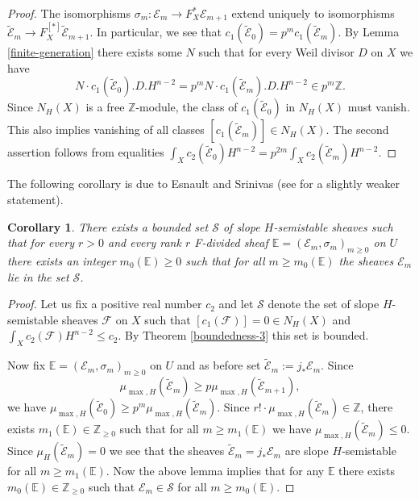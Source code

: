 \documentclass[twoside, 11pt]{article}
\theoremstyle{plain}
\newtheorem{Corollary}[Thm]{\sc Corollary}
\theoremstyle{definition}
\theoremstyle{remark}
\newcommand{\EE}{{\mathbb E}}
\newcommand{\ZZ}{{\mathbb Z}}
\newcommand{\cS}{{\mathcal S}}
\newcommand{\cE}{{\mathcal E}}
\newcommand{\cF}{{\mathcal F}}
\begin{document}
\begin{proof}
The isomorphisms $\sigma _m: \cE _m\to F_X^{*}\cE _{m+1}$ extend uniquely to
 isomorphisms $\tilde \cE _m\to F_X^{[*]}\tilde \cE _{m+1}$.
In particular, we see that $c_1 (\tilde \cE _{0})= p^{m}  c_1(\tilde \cE _{m})$. By Lemma \ref{finite-generation}
there exists some $N$ such that for every Weil divisor $D$ on $X$ we have
 $$N\cdot c_1 (\tilde \cE _{0}).D.H^{n-2}= p^{m}  N \cdot c_1(\tilde \cE _{m}).D.H^{n-2}\in p^{m}\ZZ .$$
Since $N_H(X)$ is a free $\ZZ$-module, the class of $ c_1 (\tilde \cE _{0})$ in $N_H(X)$  must vanish. This also implies vanishing of all classes $ [c_1 (\tilde \cE _{m})]\in N_H(X)$.
The second assertion follows from equalities
 $\int _Xc_2 (\tilde \cE _{0}) H^{n-2}= p^{2m} \int _Xc_2 (\tilde \cE _{m})H^{n-2}$.
\end{proof}


\medskip

The following corollary is due to Esnault and Srinivas (see \cite[Theorem 2.1]{ES} for a slightly weaker statement).

\begin{Corollary}
There exists a bounded set $\cS$ of slope $H$-semistable sheaves such that for every $r>0$ and every rank $r$ F-divided sheaf 
$\EE= (\cE_m , \sigma _m)_{m\ge 0}$ on $U$ there exists  an integer $m_0(\EE){\ge 0}$ such that for all $m\ge m_0(\EE)$ 
 the sheaves $\cE_m$ lie in the set $\cS$.
\end{Corollary}

\begin{proof}
Let us fix  a positive real number $c_2$ and let  $\cS$ denote the set of slope $H$-semistable sheaves $\cF$ on $X$
such that  $ [c_1 ( \cF )]=0\in N_H(X)$ and $\int _{X}c_2 ( \cF )H^{n-2}\le c_2$. By Theorem  \ref{boundedness-3} this set is bounded. 

Now fix $\EE= (\cE_m , \sigma _m)_{m\ge 0}$ on $U$ and as before set $\tilde \cE _m:=j_*\cE_m$.
Since $$\mu _{\max, H} (\tilde \cE_m)\ge p \mu _{\max, H} ( \tilde \cE_{m+1}),$$ we have
$\mu _{\max, H} ( \tilde \cE_0)\ge p ^m\mu _{\max, H} ( \tilde \cE_{m})$.  Since $r!\cdot \mu _{\max, H} ( \tilde \cE_{m})\in \ZZ$, there exists $m_1(\EE)\in \ZZ _{\ge 0}$ such that for all $m\ge m_1(\EE)$ we have $\mu _{\max, H} ( \tilde \cE_{m})\le 0$. Since  $\mu _{H} ( \tilde \cE_{m})= 0$ we see that
the sheaves $\tilde \cE _m=j_*\cE_m$ are slope $H$-semistable  for all $m\ge m_1(\EE)$.
Now the above lemma implies that for any $\EE$ there exists  $m_0(\EE)\in \ZZ _{\ge 0}$  such that $\cE_m\in \cS$ for all $m\ge m_0(\EE)$.
\end{proof}
\end{document}
